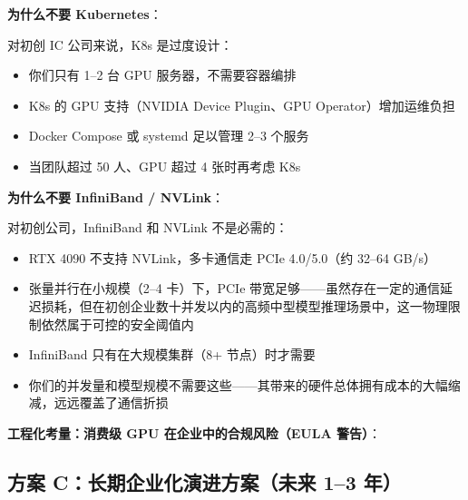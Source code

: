 \documentclass[UTF8,a4paper,10pt,oneside]{ctexart}
\begin{document}
\textbf{为什么不要 Kubernetes}：

对初创 IC 公司来说，K8s 是过度设计：
\begin{itemize}
    \item 你们只有 1--2 台 GPU 服务器，不需要容器编排
    \item K8s 的 GPU 支持（NVIDIA Device Plugin、GPU Operator）增加运维负担
    \item Docker Compose 或 systemd 足以管理 2--3 个服务
    \item 当团队超过 50 人、GPU 超过 4 张时再考虑 K8s
\end{itemize}

\textbf{为什么不要 InfiniBand / NVLink}：

对初创公司，InfiniBand 和 NVLink 不是必需的：
\begin{itemize}
    \item RTX 4090 不支持 NVLink，多卡通信走 PCIe 4.0/5.0（约 32--64 GB/s）
    \item 张量并行在小规模（2--4 卡）下，PCIe 带宽足够——虽然存在一定的通信延迟损耗，但在初创企业数十并发以内的高频中型模型推理场景中，这一物理限制依然属于可控的安全阈值内
    \item InfiniBand 只有在大规模集群（8+ 节点）时才需要
    \item 你们的并发量和模型规模不需要这些——其带来的硬件总体拥有成本的大幅缩减，远远覆盖了通信折损
\end{itemize}

\textbf{工程化考量：消费级 GPU 在企业中的合规风险（EULA 警告）}：

\begin{center}
\end{center}

\subsection{方案 C：长期企业化演进方案（未来 1--3 年）}
\end{document}

